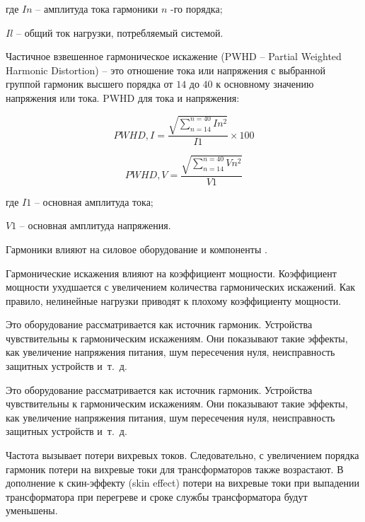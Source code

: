 где $In$ – амплитуда тока гармоники $n$ -го порядка;

$Il$ – общий ток нагрузки, потребляемый системой.

Частичное взвешенное гармоническое искажение (PWHD – Partial Weighted Harmonic Distortion) -- это отношение тока или напряжения с выбранной группой гармоник высшего порядка от $14$ до $40$ к основному значению напряжения или тока. PWHD для тока и напряжения:

\begin{equation}
	\label{eq:equation1.17}
PWHD,I = \frac{\sqrt{\displaystyle\sum_{n=14}^{n=40} In^2}}{I1} \times 100 
\end{equation} 

\begin{equation}
	\label{eq:equation1.18}
	PWHD,V = \frac{\sqrt{\displaystyle\sum_{n=14}^{n=40} Vn^2}}{V1} 
\end{equation} 

где $I1$ – основная амплитуда тока;

$V1$ – основная амплитуда напряжения.

Гармоники влияют на силовое оборудование и компоненты \cite{soni2014review, kamenka2014six}.


Гармонические искажения влияют на коэффициент мощности. Коэффициент мощности ухудшается с увеличением количества гармонических искажений. Как правило, нелинейные нагрузки приводят к плохому коэффициенту мощности.

Это оборудование рассматривается как источник гармоник. Устройства чувствительны к гармоническим искажениям. Они показывают такие эффекты, как увеличение напряжения питания, шум пересечения нуля, неисправность защитных устройств и~т.~д.

Это оборудование рассматривается как источник гармоник. Устройства чувствительны к гармоническим искажениям. Они показывают такие эффекты, как увеличение напряжения питания, шум пересечения нуля, неисправность защитных устройств и~т.~д.

Частота вызывает потери вихревых токов. Следовательно, с увеличением порядка гармоник потери на вихревые токи для трансформаторов также возрастают. В дополнение к скин-эффекту (skin effect) потери на вихревые токи при выпадении трансформатора при перегреве и сроке службы трансформатора будут уменьшены.

